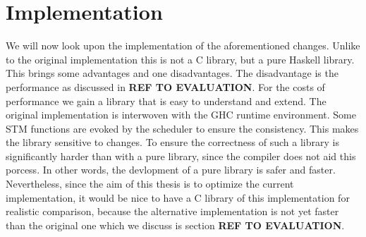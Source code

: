
\chapter{Implementation} %

\label{Chapter3}

We will now look upon the implementation of the aforementioned changes. Unlike to the original
implementation this is not a C library, but a pure Haskell library. This brings some advantages 
and one disadvantages. The disadvantage is the performance as discussed in \textbf{REF TO EVALUATION}.
For the costs of performance we gain a library that is easy to understand and extend. The original 
implementation is interwoven with the GHC runtime environment. Some STM functions are evoked by 
the scheduler to ensure the consistency. This makes the library sensitive to changes. 
To ensure the correctness of such a library is significantly harder than with a pure library, since
the compiler does not aid this porcess. In other words, the devlopment of a pure library is safer
and faster. Nevertheless, since the aim of this thesis is to optimize the current implementation,
it would be nice to have a C library of this implementation for realistic comparison, because 
the alternative implementation is not yet faster than the original one which we discuss is 
section \textbf{REF TO EVALUATION}. 